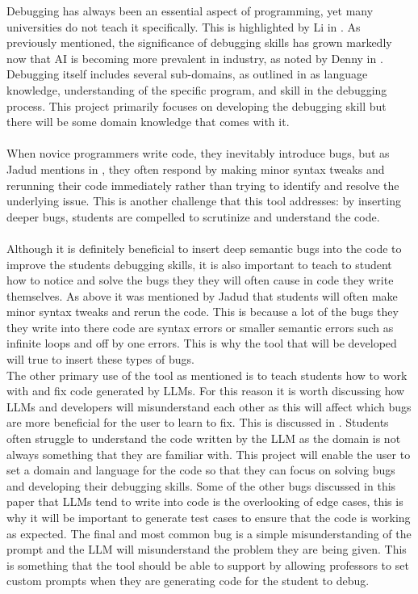 \documentclass[12pt]{extarticle}
\begin{document}
Debugging has always been an essential aspect of programming, yet many universities do not teach it specifically. This is highlighted by Li in \cite{li2019}. As previously mentioned, the significance of debugging skills has grown markedly now that AI is becoming more prevalent in industry, as noted by Denny in \cite{denny2024}. Debugging itself includes several sub-domains, as outlined in \cite{li2019} as language knowledge, understanding of the specific program, and skill in the debugging process. This project primarily focuses on developing the debugging skill but there will be some domain knowledge that comes with it.\\
\\
When novice programmers write code, they inevitably introduce bugs, but as Jadud mentions in \cite{jadud2006}, they often respond by making minor syntax tweaks and rerunning their code immediately rather than trying to identify and resolve the underlying issue. This is another challenge that this tool addresses: by inserting deeper bugs, students are compelled to scrutinize and understand the code.\\
\\
Although it is definitely beneficial to insert deep semantic bugs into the code to improve the students debugging skills, it is also important to teach to student how to notice and solve the bugs they they will often cause in code they write themselves. As above it was mentioned by Jadud that students will often make minor syntax tweaks and rerun the code. This is because a lot of the bugs they they write into there code are syntax errors or smaller semantic errors such as infinite loops and off by one errors. This is why the tool that will be developed will true to insert these types of bugs.
\\
The other primary use of the tool as mentioned is to teach students how to work with and fix code generated by LLMs. For this reason it is worth discussing how LLMs and developers will misunderstand each other as this will affect which bugs are more beneficial for the user to learn to fix. This is discussed in \cite{nguyen2024}. Students often struggle to understand the code written by the LLM as the domain is not always something that they are familiar with. This project will enable the user to set a domain and language for the code so that they can focus on solving bugs and developing their debugging skills. Some of the other bugs discussed in this paper that LLMs tend to write into code is the overlooking of edge cases, this is why it will be important to generate test cases to ensure that the code is working as expected. The final and most common bug is a simple misunderstanding of the prompt and the LLM will misunderstand the problem they are being given. This is something that the tool should be able to support by allowing professors to set custom prompts when they are generating code for the student to debug.
\end{document}
